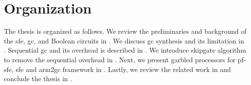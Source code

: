 \section{Organization}
The thesis is organized as follows.
We review the preliminaries and background of the \acrshort{sfe}, \acrshort{gc}, and Boolean circuits in .
We discuss \acrshort{gc} synthesis and its limitation in .
Sequential \acrshort{gc} and its overhead is described in .
We introduce \gls{skipgate} algorithm to remove the sequential overhead in .
Next, we present garbled processors for \acrshort{pf-sfe}, \acrshort{sfe} and \gls{arm2gc} framework in .
Lastly, we review the related work in  and conclude the thesis in .
